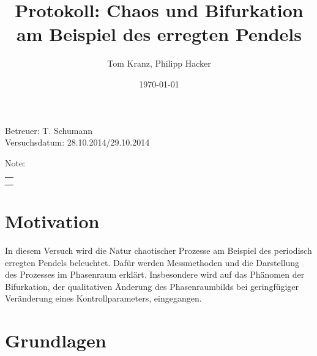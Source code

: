 \documentclass[numbers=noenddot,12pt,a4paper]{scrartcl}
\title{Protokoll: Chaos und Bifurkation am Beispiel des erregten Pendels}
\author{Tom Kranz, Philipp Hacker}
\date{\today}
\begin{document}
\maketitle
\begin{center}
Betreuer: T. Schumann \\
Versuchsdatum: 28.10.2014/29.10.2014 \\
\begin{table}[h]
\centering
Note: %
\begin{tabularx}{1.5cm}{|X|}
\hline \\ \\
\hline
\end{tabularx}
\end{table}
\end{center}
\vspace*{\fill}
\tableofcontents
\vfill
\newpage
\section{Motivation}
In diesem Versuch wird die Natur chaotischer Prozesse am Beispiel des periodisch erregten Pendels beleuchtet. Dafür werden Messmethoden und die Darstellung des Prozesses im Phasenraum erklärt. Insbesondere wird auf das Phänomen der Bifurkation, der qualitativen Änderung des Phasenraumbilds bei geringfügiger Veränderung eines Kontrollparameters, eingegangen.
\section{Grundlagen}
\end{document}
